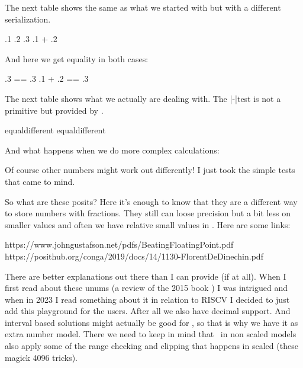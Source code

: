 \startsectionlevel[title=Posits]


The next table shows the same as what we started with but with a different
serialization.

\starttabulate[|Tr|r|]
\NC .1      \NC {}  \NC \NR
\NC .2      \NC {}  \NC \NR
\NC .3      \NC {}  \NC \NR
\NC .1 + .2 \NC {}  \NC \NR
\stoptabulate

And here we get equality in both cases:

\starttabulate[|Tr|l|]
\NC      .3 == .3 \NC {} \NC \NR
\NC .1 + .2 == .3 \NC {} \NC \NR
\stoptabulate

The next table shows what we actually are dealing with. The \type {\if}|-|test is
not a primitive but provided by \CONTEXT.

\starttabulate[|Tr|l|]
\NC {} \NC {} equal\else different\fi \NC \NR
\NC {} \NC {} equal\else different\fi \NC \NR
\stoptabulate

And what happens when we do more complex calculations:

\starttabulate[|Tr|l|]
\NC {} \NC {} \NC \NR
\NC {} \NC             {}       \NC \NR
\stoptabulate

Of course other numbers might work out differently! I just took the simple tests
that came to mind.

So what are these posits? Here it's enough to know that they are a different way
to store numbers with fractions. They still can loose precision but a bit less on
smaller values and often we have relative small values in \TEX. Here are some links:

\starttyping
https://www.johngustafson.net/pdfs/BeatingFloatingPoint.pdf
https://posithub.org/conga/2019/docs/14/1130-FlorentDeDinechin.pdf
\stoptyping

There are better explanations out there than I can provide (if at all). When I
first read about these unums (a review of the 2015 book ) I was intrigued and when in 2023 I read something about it
in relation to RISCV I decided to just add this playground for the users. After
all we also have decimal support. And interval based solutions might actually be
good for \METAPOST, so that is why we have it as extra number model. There we
need to keep in mind that \METAPOST\ in non scaled models also apply some of the
range checking and clipping that happens in scaled (these magick 4096 tricks).

